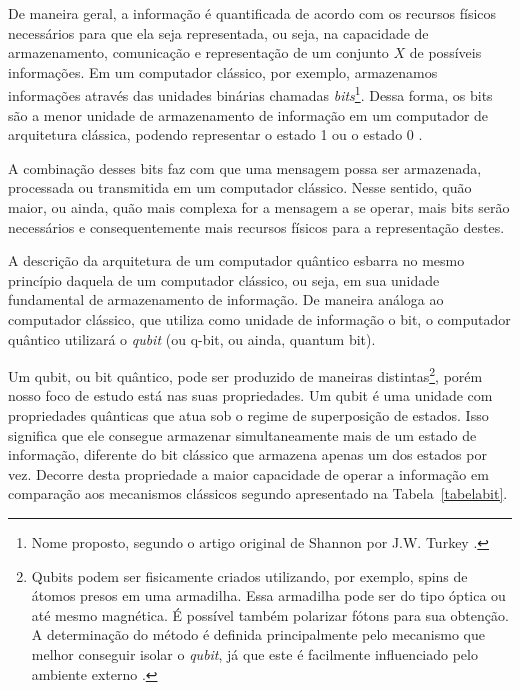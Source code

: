 \documentclass[11pt,oneside,brazil,hidelinks,article,sumario=tradicional,a4paper]{abntex2}
\begin{document}
De maneira geral, a informação é quantificada de acordo com os recursos físicos necessários para que ela seja representada, ou seja, na capacidade de armazenamento, comunicação e representação de um conjunto $X$ de possíveis informações. Em um computador clássico, por exemplo, armazenamos informações através das unidades binárias chamadas \textit{bits}\footnote{Nome proposto, segundo o artigo original de Shannon por J.W. Turkey \cite{MTC}.}. Dessa forma, os bits são a menor unidade de armazenamento de informação em um computador de arquitetura clássica, podendo representar o estado 1 ou o estado 0 \cite{MTC}.

A combinação desses bits faz com que uma mensagem possa ser armazenada, processada ou transmitida em um computador clássico. Nesse sentido, quão maior, ou ainda, quão mais complexa for a mensagem a se operar, mais bits serão necessários e consequentemente mais recursos físicos para a representação destes.

A descrição da arquitetura de um computador quântico esbarra no mesmo princípio daquela de um computador clássico, ou seja, em sua unidade fundamental de armazenamento de informação. De maneira análoga ao computador clássico, que utiliza como unidade de informação o bit, o computador quântico utilizará o \textit{qubit} (ou q-bit, ou ainda, quantum bit).

Um qubit, ou bit quântico, pode ser produzido de maneiras distintas\footnote{Qubits podem ser fisicamente criados utilizando, por exemplo, spins de átomos presos em uma armadilha. Essa armadilha pode ser do tipo óptica ou até mesmo magnética. É possível também polarizar fótons para sua obtenção. A determinação do método é definida principalmente pelo mecanismo que melhor conseguir isolar o \textit{qubit}, já que este é facilmente influenciado pelo ambiente externo \cite{materialdidaticomecquantica}.}, porém nosso foco de estudo está nas suas propriedades. Um qubit é uma unidade com propriedades quânticas que atua sob o regime de superposição de estados. Isso significa que ele consegue armazenar simultaneamente mais de um estado de informação, diferente do bit clássico que armazena apenas um dos estados por vez. Decorre desta propriedade a maior capacidade de operar a informação em comparação aos mecanismos clássicos segundo apresentado na Tabela~\ref{tabelabit}.
\end{document}
